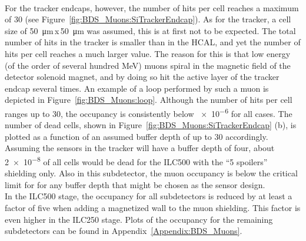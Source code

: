 \\For the \sid tracker endcaps, however, the number of hits per cell reaches a maximum of 30 (see Figure~\ref{fig:BDS_Muons:SiTrackerEndcap}).
As for the \sid tracker, a cell size of \SI{50}{\micro\meter}\,x\,\SI{50}{\micro\meter} was assumed, this is at first not to be expected.
The total number of hits in the tracker is smaller than in the HCAL, and yet the number of hits per cell reaches a much larger value.
The reason for this is that low energy (of the order of several hundred MeV) muons spiral in the magnetic field of the detector solenoid magnet, and by doing so hit the active layer of the tracker endcap several times.
An example of a loop performed by such a muon is depicted in Figure~\ref{fig:BDS_Muons:loop}.
Although the number of hits per cell ranges up to 30, the occupancy is consistently below \num{e-6} for all cases.
The number of dead cells, shown in Figure~\ref{fig:BDS_Muons:SiTrackerEndcap} (b), is plotted as a function of an assumed buffer depth of up to 30 accordingly.
Assuming the sensors in the \sid tracker will have a buffer depth of four, about \num{2e-8} of all cells would be dead for the ILC500 with the ``5 spoilers'' shielding only.
Also in this subdetector, the muon occupancy is below the critical limit for \sid for any buffer depth that might be chosen as the sensor design.
\\In the ILC500 stage, the occupancy for all subdetectors is reduced by at least a factor of five when adding a magnetized wall to the muon shielding.
This factor is even higher in the ILC250 stage.
Plots of the occupancy for the remaining \sid subdetectors can be found in Appendix~\ref{Appendix:BDS_Muons}.
